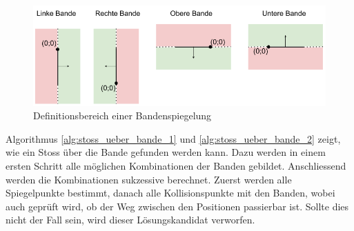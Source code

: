 \begin{figure}[h!]
    \begin{center}
        \includegraphics[width=1\linewidth]{../common/03_billiard_ai/resources/51_definitionsbereich_spiegelung_bande.png}
    \end{center}
    \caption{Definitionsbereich einer Bandenspiegelung}
    \label{fig:Definitionsbereich_Bandenspiegelung}
\end{figure}

Algorithmus \ref{alg:stoss_ueber_bande_1} und \ref{alg:stoss_ueber_bande_2} zeigt, wie ein Stoss über die Bande gefunden werden kann.
Dazu werden in einem ersten Schritt alle möglichen Kombinationen der Banden gebildet. Anschliessend werden die
Kombinationen sukzessive berechnet. Zuerst werden alle Spiegelpunkte bestimmt, danach alle Kollisionspunkte mit den
Banden, wobei auch geprüft wird, ob der Weg zwischen den Positionen passierbar ist. Sollte dies nicht der Fall sein,
wird dieser Lösungskandidat verworfen.

